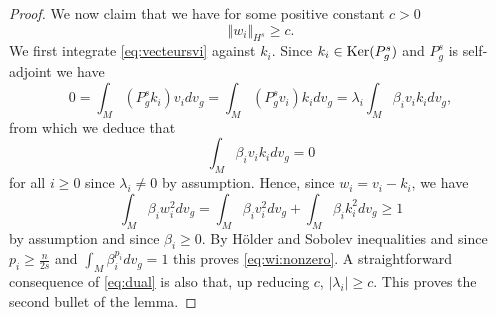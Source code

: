 \documentclass[10pt]{amsart}
\numberwithin{equation}{section}
\def\ker{{\mathop{\rm Ker}}}
\theoremstyle{plain}
\theoremstyle{remark}
\begin{document}
\begin{proof}
We now claim that we have for some positive constant $c>0$
\begin{equation} \label{eq:wi:nonzero}
 \Vert w_i \Vert_{H^s} \geq c.
\end{equation}
We first integrate \eqref{eq:vecteursvi} against $k_i$. Since $k_i \in \ker(P_g^s)$ and $P_g^s$ is self-adjoint we have 
\begin{equation*}
 0 = \int_M (P_g^s k_i) v_i dv_g = \int_M (P_g^s v_i) k_i dv_g = \lambda_i \int_M \beta_i v_i k_i dv_g, 
 \end{equation*}
from which we deduce that 
\begin{equation} \label{eq:ortho:noyau}
\int_M \beta_i v_i k_i dv_g = 0
 \end{equation}
 for all $i \ge 0$ since $\lambda_i \neq 0$ by assumption. Hence, since $w_i = v_i - k_i$, we have 
\begin{equation} \label{eq:intwi}
  \int_M \beta_i w_i^2 dv_g = \int_M \beta_i v_i^2dv_g + \int_M \beta_i k_i^2dv_g \ge 1 
  \end{equation}
by assumption and since $\beta_i \ge 0$. By H\"older and Sobolev inequalities and since $p_i \ge \frac{n}{2s}$ and $\int_M \beta_i^{p_i}dv_g = 1$ this proves \eqref{eq:wi:nonzero}. A straightforward consequence of \eqref{eq:dual} is also that, up reducing $c$, $ |\lambda_i| \geq c$. This proves the second bullet of the lemma. 
 

\end{proof}
\end{document}
